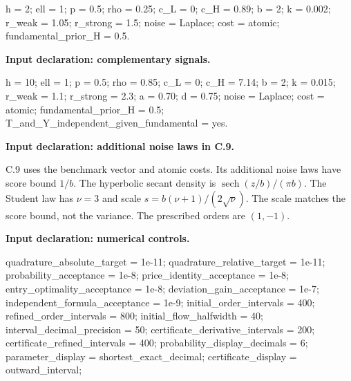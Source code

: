 \documentclass[
  11pt,
]{article}
\newenvironment{Shaded}{}{}
\newcommand{\NormalTok}[1]{#1}
\begin{document}
\begin{Shaded}
\begin{Highlighting}[]
\NormalTok{h = 2; ell = 1; p = 0.5; rho = 0.25;}
\NormalTok{c\_L = 0; c\_H = 0.89; b = 2; k = 0.002;}
\NormalTok{r\_weak = 1.05; r\_strong = 1.5;}
\NormalTok{noise = Laplace; cost = atomic; fundamental\_prior\_H = 0.5.}
\end{Highlighting}
\end{Shaded}


\textbf{Input declaration: complementary signals.}

\begin{Shaded}
\begin{Highlighting}[]
\NormalTok{h = 10; ell = 1; p = 0.5; rho = 0.85;}
\NormalTok{c\_L = 0; c\_H = 7.14; b = 2; k = 0.015;}
\NormalTok{r\_weak = 1.1; r\_strong = 2.3; a = 0.70; d = 0.75;}
\NormalTok{noise = Laplace; cost = atomic; fundamental\_prior\_H = 0.5;}
\NormalTok{T\_and\_Y\_independent\_given\_fundamental = yes.}
\end{Highlighting}
\end{Shaded}


\textbf{Input declaration: additional noise laws in C.9.}

C.9 uses the benchmark vector and atomic costs. Its additional noise
laws have score bound \(1/b\). The hyperbolic secant density is
\(\operatorname{sech}(z/b)/(\pi b)\). The Student law has \(\nu=3\) and
scale \(s=b(\nu+1)/(2\sqrt{\nu})\). The scale matches the score bound,
not the variance. The prescribed orders are \((1,-1)\).


\textbf{Input declaration: numerical controls.}

\begin{Shaded}
\begin{Highlighting}[]
\NormalTok{quadrature\_absolute\_target = 1e{-}11;}
\NormalTok{quadrature\_relative\_target = 1e{-}11;}
\NormalTok{probability\_acceptance = 1e{-}8;}
\NormalTok{price\_identity\_acceptance = 1e{-}8;}
\NormalTok{entry\_optimality\_acceptance = 1e{-}8;}
\NormalTok{deviation\_gain\_acceptance = 1e{-}7;}
\NormalTok{independent\_formula\_acceptance = 1e{-}9;}
\NormalTok{initial\_order\_intervals = 400;}
\NormalTok{refined\_order\_intervals = 800;}
\NormalTok{initial\_flow\_halfwidth = 40;}
\NormalTok{interval\_decimal\_precision = 50;}
\NormalTok{certificate\_derivative\_intervals = 200;}
\NormalTok{certificate\_refined\_intervals = 400;}
\NormalTok{probability\_display\_decimals = 6;}
\NormalTok{parameter\_display = shortest\_exact\_decimal;}
\NormalTok{certificate\_display = outward\_interval;}
\end{Highlighting}
\end{Shaded}
\end{document}
